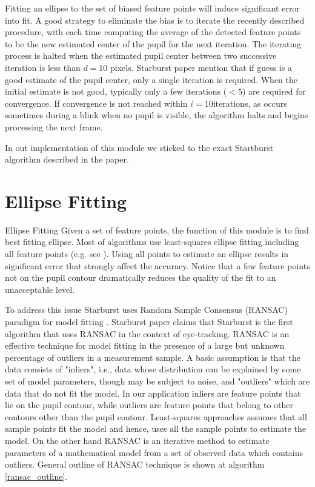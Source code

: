 \documentclass[12pt,fleqn]{book} %
\begin{document}
Fitting an ellipse to the set of biased feature points will induce significant error into fit. A good strategy to eliminate the bias is to iterate the recently described procedure, with each time computing the average of the detected feature points to be the new estimated center of the pupil for the next iteration. The iterating process is halted when the estimated pupil center between two successive iteration is less than $d = 10$ pixels. Starburst paper mention that if guess is a good estimate of the pupil center, only a single iteration is required. When the initial estimate is not good, typically only a few iterations ($< 5$) are required for convergence. If convergence is not reached within $i = 10 $iterations, as occurs sometimes during a blink when no pupil is visible, the algorithm halts and begins processing the next frame. \bigskip

In out implementation of this module we sticked to the exact Startburst algorithm described in the paper.



\section{Ellipse Fitting}{Ellipse Fitting}
Given a set of feature points, the function of this module is to find best fitting ellipse.  Most of algorithms use least-squares ellipse fitting including all feature points (e.g. see \cite{least_squares}). Using all points to estimate an ellipse results in significant error that strongly affect the accuracy. Notice that a few feature points not on the pupil contour dramatically reduces the quality of the fit to an unacceptable level.  \bigskip

To address this issue Starburst uses Random Sample Consensus (RANSAC) paradigm for model fitting \cite{ransac}. Starburst paper claims that Starburst is the first algorithm that uses RANSAC in the context of eye-tracking. RANSAC is an effective technique for model fitting in the presence of a large but unknown percentage of outliers in a measurement sample. A basic assumption is that the data  consists of "inliers", i.e., data whose distribution can be explained by some set of model parameters, though may be subject to noise, and "outliers" which are data that do not fit the model. In our application inliers are feature points that lie on the pupil contour, while outliers are feature points that belong to other contours other than the pupil contour. Least-squares approaches assumes that all sample points fit the model and hence, uses all the sample points to estimate the model. On the other hand RANSAC is an iterative method to estimate parameters of a mathematical model from a set of observed data which contains outliers. General outline of RANSAC technique is shown at algorithm \ref{ransac_outline}. \bigskip
\end{document}
